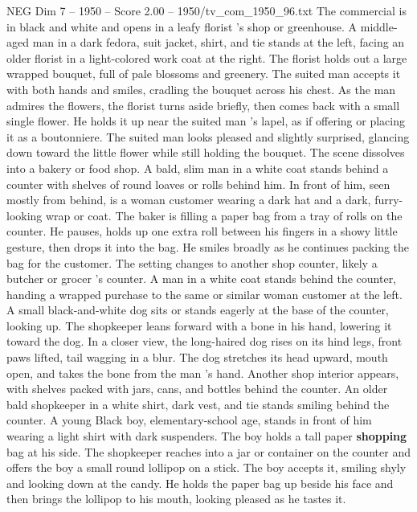 \begin{textsample}{NEG Dim 7 – 1950 – Score 2.00 – 1950/tv\_com\_1950\_96.txt}  \label{ex:f7_neg_083}
The commercial is in black and white and opens in a leafy florist ’s shop or greenhouse.
A middle-aged man in a dark fedora, suit jacket, shirt, and tie stands at the left, facing an older florist in a light-colored work coat at the right.
The florist holds out a large wrapped bouquet, full of pale blossoms and greenery.
The suited man accepts it with both hands and smiles, cradling the bouquet across his chest.
As the man admires the flowers, the florist turns aside briefly, then comes back with a small single flower.
He holds it up near the suited man ’s lapel, as if offering or placing it as a boutonniere.
The suited man looks pleased and slightly surprised, glancing down toward the little flower while still holding the bouquet.
The scene dissolves into a bakery or food shop.
A bald, slim man in a white coat stands behind a counter with shelves of round loaves or rolls behind him.
In front of him, seen mostly from behind, is a woman customer wearing a dark hat and a dark, furry-looking wrap or coat.
The baker is filling a paper bag from a tray of rolls on the counter.
He pauses, holds up one extra roll between his fingers in a showy little gesture, then drops it into the bag.
He smiles broadly as he continues packing the bag for the customer.
The setting changes to another shop counter, likely a butcher or grocer ’s counter.
A man in a white coat stands behind the counter, handing a wrapped purchase to the same or similar woman customer at the left.
A small black-and-white dog sits or stands eagerly at the base of the counter, looking up.
The shopkeeper leans forward with a bone in his hand, lowering it toward the dog.
In a closer view, the long-haired dog rises on its hind legs, front paws lifted, tail wagging in a blur.
The dog stretches its head upward, mouth open, and takes the bone from the man ’s hand.
Another shop interior appears, with shelves packed with jars, cans, and bottles behind the counter.
An older bald shopkeeper in a white shirt, dark vest, and tie stands smiling behind the counter.
A young Black boy, elementary-school age, stands in front of him wearing a light shirt with dark suspenders.
The boy holds a tall paper \textbf{shopping} bag at his side.
The shopkeeper reaches into a jar or container on the counter and offers the boy a small round lollipop on a stick.
The boy accepts it, smiling shyly and looking down at the candy.
He holds the paper bag up beside his face and then brings the lollipop to his mouth, looking pleased as he tastes it.

\end{textsample}
